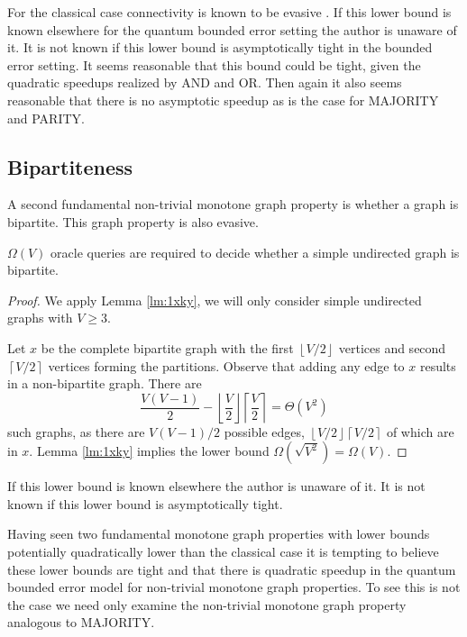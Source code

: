 For the classical case connectivity is known to be evasive
\cite{felsner92complexity}.  If this lower bound is known elsewhere for 
the quantum bounded error setting the author is unaware of it.  It is
not known if this lower bound is asymptotically tight in the bounded
error setting.  It seems reasonable that this bound could be tight,
given the quadratic speedups realized by AND and OR.  Then again it
also seems reasonable that there is no asymptotic speedup as is the
case for MAJORITY and PARITY.

\subsection{Bipartiteness}
\label{sec:bip}

A second fundamental non-trivial monotone graph property is whether a
graph is bipartite.  This graph property is also evasive.

\begin{theorem}
\label{th:nbpt}
$\Omega(V)$ oracle queries are required to decide whether a simple
undirected graph is bipartite.
\end{theorem}

\begin{proof}
We apply Lemma \ref{lm:1xky}, we will only consider simple undirected
graphs with $V \ge 3$.  

Let $x$ be the complete bipartite graph with the first $\left\lfloor
V/2 \right\rfloor$ vertices and second $\left\lceil V/2 \right\rceil$
vertices forming the partitions.  Observe that adding any edge to $x$
results in a non-bipartite graph.  There are
\[
\frac{V(V-1)}{2} - {\left\lfloor\frac{V}{2}\right\rfloor} {\left\lceil\frac{V}{2}\right\rceil} 
= \Theta(V^{2})
\]
such graphs, as there are $V(V-1)/2$ possible edges, $\left\lfloor
V/2\right\rfloor \left\lceil V/2\right\rceil$ of which are in $x$.
Lemma \ref{lm:1xky} implies the lower bound $\Omega(\sqrt{V^{2}}) =
\Omega(V)$.
\end{proof}

If this lower bound is known elsewhere the author is unaware of it.
It is not known if this lower bound is asymptotically tight.  

Having seen two fundamental monotone graph properties with lower
bounds potentially quadratically lower than the classical case it is
tempting to believe these lower bounds are tight and that there is
quadratic speedup in the quantum bounded error model for non-trivial
monotone graph properties.  To see this is not the case we need only
examine the non-trivial monotone graph property analogous to MAJORITY.

